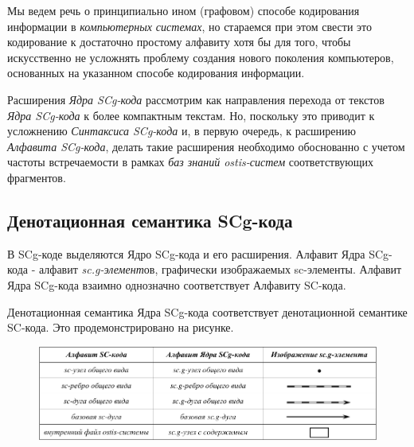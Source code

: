Мы ведем речь о принципиально ином (графовом) способе кодирования информации в \textit{компьютерных системах}, но стараемся при этом свести это кодирование к достаточно простому алфавиту хотя бы для того, чтобы искусственно не усложнять проблему создания нового поколения компьютеров, основанных на указанном способе кодирования информации. 

Расширения \textit{Ядра SCg-кода} рассмотрим как направления перехода от текстов \textit{Ядра SCg-кода} к более компактным текстам. Но, поскольку это приводит к усложнению \textit{Синтаксиса SCg-кода} и, в первую очередь, к расширению \textit{Алфавита SCg-кода}, делать такие расширения необходимо обоснованно с учетом частоты встречаемости в рамках \textit{баз знаний ostis-систем} соответствующих фрагментов.


\subsection{Денотационная семантика SCg-кода}

В SCg-коде выделяются Ядро SCg-кода и его расширения. 
Алфавит Ядра SCg-кода - алфавит  \textit{sc.g-элемент}ов, графически изображаемых sc-элементы. Алфавит Ядра SCg-кода взаимно однозначно соответствует Алфавиту SC-кода.

Денотационная семантика Ядра SCg-кода соответствует денотационной семантике SC-кода. Это продемонстрировано на рисунке.


\begin{figure}[h]
	\centering
	\includegraphics[scale=0.8]{images/intro/scg/SCg-core-alphabet.pdf}
\end{figure}


